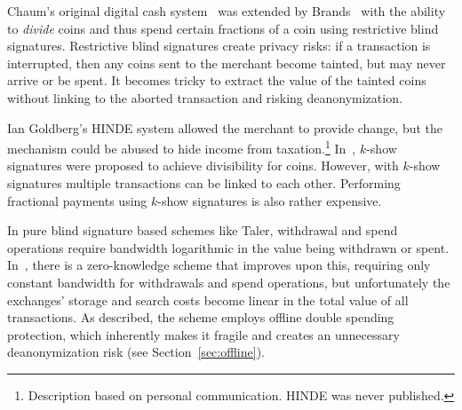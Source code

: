 \documentclass[sigconf, authordraft]{acmart}
\begin{document}
Chaum's original digital cash system~\cite{chaum1983blind} was
extended by Brands~\cite{brands1993efficient} with the ability to {\em
  divide} coins and thus spend certain fractions of a coin using
restrictive blind signatures.  Restrictive blind signatures create
privacy risks: if a transaction is interrupted, then any coins sent
to the merchant become tainted, but may never arrive or be spent.
It becomes tricky to extract the value of the tainted coins without
linking to the aborted transaction and risking deanonymization.

Ian Goldberg's HINDE system allowed the merchant to provide change,
but the mechanism could be abused to hide income from
taxation.\footnote{Description based on personal communication. HINDE
  was never published.}
In~\cite{brands1993efficient}, $k$-show signatures were proposed to
achieve divisibility for coins.  However, with $k$-show signatures
multiple transactions can be linked to each other.
Performing fractional payments using $k$-show signatures is also
rather expensive.

In pure blind signature based schemes like Taler, withdrawal and spend
operations require bandwidth logarithmic in the value being withdrawn
or spent.  In~\cite{Camenisch05compacte-cash}, there is a zero-knowledge
scheme that improves upon this, requiring only constant bandwidth for
withdrawals and spend operations, but unfortunately the exchanges' storage and
search costs become linear in the total value of all transactions.
As described, the scheme employs offline double spending protection,
which inherently makes it fragile and creates an unnecessary
deanonymization risk (see Section~\ref{sec:offline}).
%
%
\end{document}
